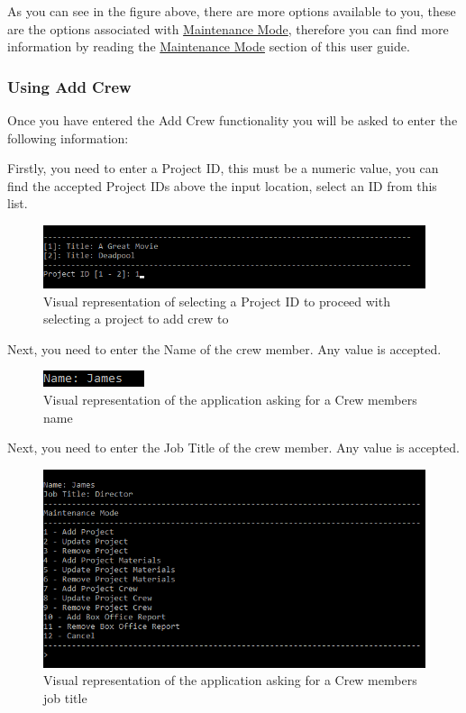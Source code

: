 \documentclass[
  english,
  a4paper,
,tablecaptionabove
]{scrartcl}
\begin{document}
As you can see in the figure above, there are more options available to
you, these are the options associated with
\protect\hyperlink{using-maintenance-mode}{Maintenance Mode}, therefore
you can find more information by reading the
\protect\hyperlink{using-maintenance-mode}{Maintenance Mode} section of
this user guide.

\newpage

\hypertarget{using-add-crew}{%
\subsubsection{Using Add Crew}\label{using-add-crew}}

Once you have entered the Add Crew functionality you will be asked to
enter the following information:

Firstly, you need to enter a Project ID, this must be a numeric value,
you can find the accepted Project IDs above the input location, select
an ID from this list.

\begin{figure}
\centering
\includegraphics{images/user-guide/maintenance-mode/update-project-select-id.png}
\caption{Visual representation of selecting a Project ID to proceed with
selecting a project to add crew to}
\end{figure}

Next, you need to enter the Name of the crew member. Any value is
accepted.

\begin{figure}
\centering
\includegraphics{images/user-guide/maintenance-mode/add-crew-name.png}
\caption{Visual representation of the application asking for a Crew
members name}
\end{figure}

Next, you need to enter the Job Title of the crew member. Any value is
accepted.

\begin{figure}
\centering
\includegraphics{images/user-guide/maintenance-mode/add-crew-job-title.png}
\caption{Visual representation of the application asking for a Crew
members job title}
\end{figure}
\end{document}
